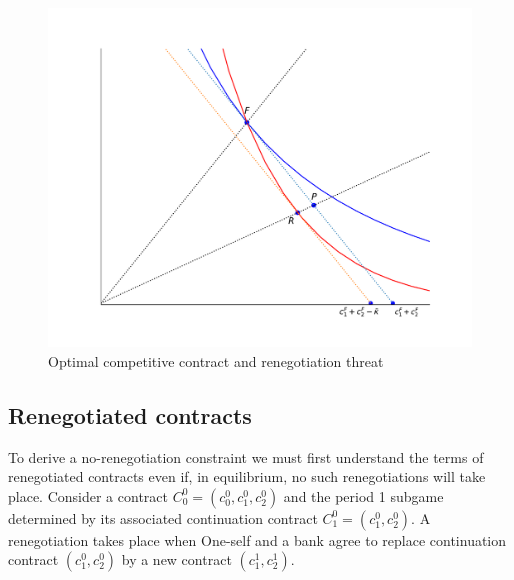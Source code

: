 \documentclass[11pt,english]{article}
\theoremstyle{plain}
\theoremstyle{definition}
\begin{document}
\begin{figure}[p]
  \includegraphics[scale=0.6]{Figure1.pdf}
  \caption{Optimal competitive contract and renegotiation threat}
  \label{fig:c1c2}
\end{figure}


\subsection{Renegotiated contracts}

To derive a no-renegotiation constraint we must first understand the
terms of renegotiated contracts even if, in equilibrium, no such renegotiations
will take place. Consider a contract $C_{0}^{0}=(c_{0}^{0},c_{1}^{0},c_{2}^{0})$
and the period 1 subgame determined by its associated continuation
contract $C_{1}^{0}=(c_{1}^{0},c_{2}^{0})$. A renegotiation takes
place when One-self and a bank agree to replace continuation contract
$(c_{1}^{0},c_{2}^{0})$ by a new contract $\left(c_{1}^{1},c_{2}^{1}\right)$.
\end{document}
